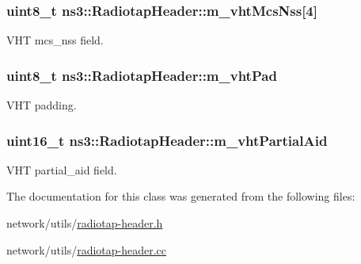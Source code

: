 \subsubsection[{\texorpdfstring{m\+\_\+vht\+Mcs\+Nss}{m_vhtMcsNss}}]{\setlength{\rightskip}{0pt plus 5cm}uint8\+\_\+t ns3\+::\+Radiotap\+Header\+::m\+\_\+vht\+Mcs\+Nss\mbox{[}4\mbox{]}\hspace{0.3cm}{\ttfamily [private]}}\hypertarget{classns3_1_1RadiotapHeader_a771386b3e7e6bbc2e44a241ae6cf1797}{}\label{classns3_1_1RadiotapHeader_a771386b3e7e6bbc2e44a241ae6cf1797}


V\+HT mcs\+\_\+nss field. 

\subsubsection[{\texorpdfstring{m\+\_\+vht\+Pad}{m_vhtPad}}]{\setlength{\rightskip}{0pt plus 5cm}uint8\+\_\+t ns3\+::\+Radiotap\+Header\+::m\+\_\+vht\+Pad\hspace{0.3cm}{\ttfamily [private]}}\hypertarget{classns3_1_1RadiotapHeader_ae9875044826afec2aefbaaa79672faa7}{}\label{classns3_1_1RadiotapHeader_ae9875044826afec2aefbaaa79672faa7}


V\+HT padding. 

\subsubsection[{\texorpdfstring{m\+\_\+vht\+Partial\+Aid}{m_vhtPartialAid}}]{\setlength{\rightskip}{0pt plus 5cm}uint16\+\_\+t ns3\+::\+Radiotap\+Header\+::m\+\_\+vht\+Partial\+Aid\hspace{0.3cm}{\ttfamily [private]}}\hypertarget{classns3_1_1RadiotapHeader_a39d6fde2fceecb55e847f28e89f2ed4d}{}\label{classns3_1_1RadiotapHeader_a39d6fde2fceecb55e847f28e89f2ed4d}


V\+HT partial\+\_\+aid field. 



The documentation for this class was generated from the following files\+:\begin{DoxyCompactItemize}
\item 
network/utils/\hyperlink{radiotap-header_8h}{radiotap-\/header.\+h}\item 
network/utils/\hyperlink{radiotap-header_8cc}{radiotap-\/header.\+cc}\end{DoxyCompactItemize}
